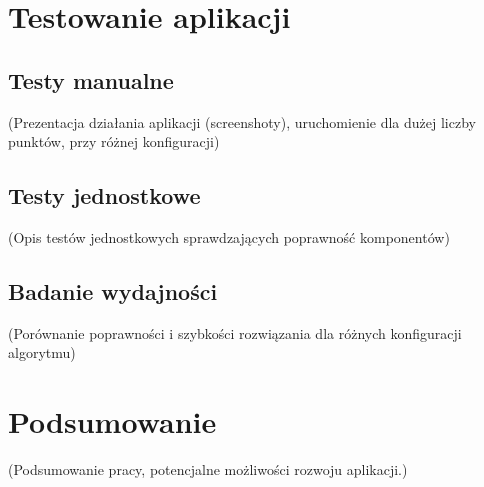 \documentclass[12pt,a4paper]{report}
\begin{document}
	\chapter{Testowanie aplikacji}
	\section{Testy manualne}
	(Prezentacja działania aplikacji (screenshoty), uruchomienie dla dużej liczby punktów, przy różnej konfiguracji)
	\section{Testy jednostkowe}
	\label{sec:testy_jednostkowe}
	(Opis testów jednostkowych sprawdzających poprawność komponentów)
	\section{Badanie wydajności}
	(Porównanie poprawności i szybkości rozwiązania dla różnych konfiguracji algorytmu)
	
	\chapter*{Podsumowanie}
		(Podsumowanie pracy, potencjalne możliwości rozwoju aplikacji.)
		
	
	
\end{document}
